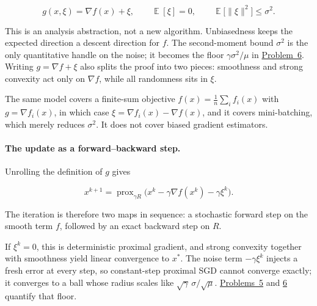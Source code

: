 \documentclass[11pt,a4paper]{article}
\DeclareMathOperator{\E}{\mathbb{E}}
\DeclareMathOperator{\prox}{prox}
\newcommand{\jump}[2]{\hyperref[#1]{#2}}
\theoremstyle{definition}
\begin{document}
\[
g(x,\xi)=\nabla f(x)+\xi,
\qquad
\E[\xi]=0,
\qquad
\E\bigl[\|\xi\|^2\bigr]\le\sigma^2.
\]

This is an analysis abstraction, not a new algorithm. Unbiasedness keeps the expected direction a descent direction for $f$. The second-moment bound $\sigma^2$ is the only quantitative handle on the noise; it becomes the floor $\gamma\sigma^2/\mu$ in \jump{prob:spr2025-opt-6}{Problem~6}. Writing $g=\nabla f+\xi$ also splits the proof into two pieces: smoothness and strong convexity act only on $\nabla f$, while all randomness sits in $\xi$.

The same model covers a finite-sum objective $f(x)=\frac{1}{n}\sum_i f_i(x)$ with $g=\nabla f_i(x)$, in which case $\xi=\nabla f_i(x)-\nabla f(x)$, and it covers mini-batching, which merely reduces $\sigma^2$. It does not cover biased gradient estimators.

\paragraph{The update as a forward--backward step.}
Unrolling the definition of $g$ gives

\[
x^{k+1}
=\prox_{\gamma R}\bigl(x^k-\gamma\nabla f(x^k)-\gamma\xi^k\bigr).
\]

The iteration is therefore two maps in sequence: a stochastic forward step on the smooth term $f$, followed by an exact backward step on $R$.

\begin{center}
\end{center}

If $\xi^k=0$, this is deterministic proximal gradient, and strong convexity together with smoothness yield linear convergence to $x^*$. The noise term $-\gamma\xi^k$ injects a fresh error at every step, so constant-step proximal SGD cannot converge exactly; it converges to a ball whose radius scales like $\sqrt{\gamma}\,\sigma/\sqrt{\mu}$. \jump{prob:spr2025-opt-5}{Problems~5} and \jump{prob:spr2025-opt-6}{6} quantify that floor.
\end{document}
